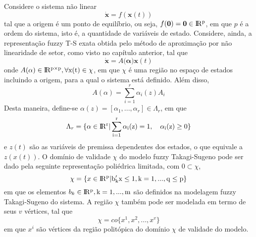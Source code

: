 Considere o sistema não linear
\begin{equation}\label{eq:nonlinear_system_cap_stability}
\dot{\mathbf{x}} = f(\mathbf{x}(t))
\end{equation}
tal que a origem é um ponto de equilíbrio, ou seja, $f(\textbf{0}) = \textbf{0} \in \rm I\!R^p$, em que $p$ é a ordem do sistema, isto é, a quantidade de variáveis de estado. Considere, ainda, a representação fuzzy T-S exata obtida pelo método de aproximação por não linearidade de setor, como visto no capítulo anterior, tal que
\begin{equation}\label{eq:fuzzy_TS_system_cap_stability}
\dot{\mathbf{x}} = A(\mathbf{\alpha) x}(t)
\end{equation}
onde $A(\alpha) \in \rm I\!R^{p \times p}, \forall x(t) \in \chi$, em que $\chi$ é uma região no espaço de estados incluindo a origem, para a qual o sistema está definido. Além disso,
\begin{equation}\label{eq:A_alpha_cap_stability}
A(\alpha) = \sum_{i = 1}^{r} \alpha_i(z)A_i
\end{equation}
Desta maneira, define-se $\alpha(z) = [\alpha_1, ..., \alpha_r] \in \Lambda_r$, em que
\begin{equation}\label{lambda_r}
\Lambda_r = \{\alpha \in \rm I\!R^r | \sum_{i = 1}^{r} \alpha_i(z) = 1,\quad \alpha_i(z) \geq 0\}
\end{equation}
e $z(t)$ são as variáveis de premissa dependentes dos estados, o que equivale a $z(x(t))$. O domínio de validade $\chi$ do modelo fuzzy Takagi-Sugeno pode ser dado pela seguinte representação poliédrica limitada, com $0 \subset \chi$,
\begin{equation}\label{eq:chibk}
\chi = 
\{ x \in \rm I\!R^{p} | b_k'x \leq 1, k = 1, ..., q \leq p\}
\end{equation}
em que os elementos $b_k \in \rm I\!R^{p}, k = 1, ..., m$ são definidos na modelagem fuzzy Takagi-Sugeno do sistema. A região $\chi$ também pode ser modelada em termo de seus $v$ vértices, tal que
\begin{equation}\label{eq:chixk}
\chi = 
co\{ x^1, x^2, ..., x^v \}
\end{equation}
em que $x^{i}$ são vértices da região politópica do domínio $\chi$ de validade do modelo.
